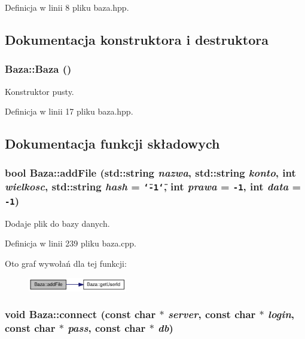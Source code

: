 Definicja w linii 8 pliku baza.hpp.

\subsection{Dokumentacja konstruktora i destruktora}
\hypertarget{a00001_8edd83a7fa98b203a1ab58157a1660a4}{
\subsubsection[{Baza}]{\setlength{\rightskip}{0pt plus 5cm}Baza::Baza ()}}
\label{d8/d84/a00001_8edd83a7fa98b203a1ab58157a1660a4}


Konstruktor pusty. 



Definicja w linii 17 pliku baza.hpp.

\subsection{Dokumentacja funkcji składowych}
\hypertarget{a00001_abbda65be49dfb28b1a578d0383599fa}{
\subsubsection[{addFile}]{\setlength{\rightskip}{0pt plus 5cm}bool Baza::addFile (std::string {\em nazwa}, \/  std::string {\em konto}, \/  int {\em wielkosc}, \/  std::string {\em hash} = {\tt \char`\"{}-1\char`\"{}}, \/  int {\em prawa} = {\tt -1}, \/  int {\em data} = {\tt -1})}}
\label{d8/d84/a00001_abbda65be49dfb28b1a578d0383599fa}


Dodaje plik do bazy danych. 



Definicja w linii 239 pliku baza.cpp.

Oto graf wywołań dla tej funkcji:\nopagebreak
\begin{figure}[H]
\begin{center}
\leavevmode
\includegraphics[width=122pt]{d8/d84/a00001_abbda65be49dfb28b1a578d0383599fa_cgraph}
\end{center}
\end{figure}
\hypertarget{a00001_bef61cc396e46d347a47c75e9ef8dfde}{
\subsubsection[{connect}]{\setlength{\rightskip}{0pt plus 5cm}void Baza::connect (const char $\ast$ {\em server}, \/  const char $\ast$ {\em login}, \/  const char $\ast$ {\em pass}, \/  const char $\ast$ {\em db})}}
\label{d8/d84/a00001_bef61cc396e46d347a47c75e9ef8dfde}


